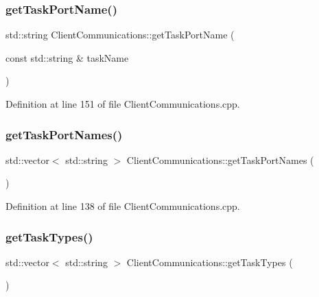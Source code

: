 \subsubsection{\texorpdfstring{get\+Task\+Port\+Name()}{getTaskPortName()}}
{\footnotesize\ttfamily std\+::string Client\+Communications\+::get\+Task\+Port\+Name (\begin{DoxyParamCaption}\item[{const std\+::string \&}]{task\+Name }\end{DoxyParamCaption})}



Definition at line 151 of file Client\+Communications.\+cpp.

\hypertarget{classocra__recipes_1_1ClientCommunications_abff3747f063489056f41c99edb7e1e3b}{}\label{classocra__recipes_1_1ClientCommunications_abff3747f063489056f41c99edb7e1e3b} 
\subsubsection{\texorpdfstring{get\+Task\+Port\+Names()}{getTaskPortNames()}}
{\footnotesize\ttfamily std\+::vector$<$ std\+::string $>$ Client\+Communications\+::get\+Task\+Port\+Names (\begin{DoxyParamCaption}{ }\end{DoxyParamCaption})}



Definition at line 138 of file Client\+Communications.\+cpp.

\hypertarget{classocra__recipes_1_1ClientCommunications_a0a7b2eeaa35d925e63ba4568be1e4919}{}\label{classocra__recipes_1_1ClientCommunications_a0a7b2eeaa35d925e63ba4568be1e4919} 
\subsubsection{\texorpdfstring{get\+Task\+Types()}{getTaskTypes()}}
{\footnotesize\ttfamily std\+::vector$<$ std\+::string $>$ Client\+Communications\+::get\+Task\+Types (\begin{DoxyParamCaption}{ }\end{DoxyParamCaption})}

